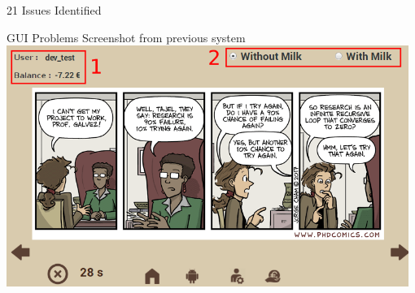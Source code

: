 \documentclass[t]{beamer}
\begin{document}
\begin{frame}{21 Issues Identified}
\begin{itemize}
    \end{itemize}
\end{frame}

\begin{frame}{GUI Problems}
    \scriptsize{Screenshot from previous system}
    \includegraphics[width=0.98\textwidth]{../thesis/images/order-page-v2.png}
\end{frame}
\end{document}
